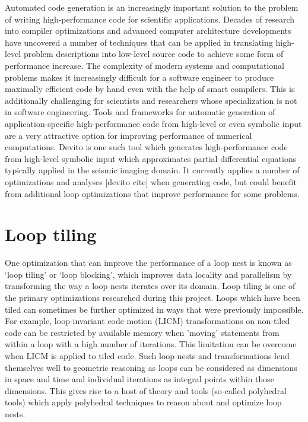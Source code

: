 \documentclass[a4paper,12pt,twoside]{report}
\begin{document}
Automated code generation is an increasingly important solution to the problem of writing high-performance code
for scientific applications. Decades of research into compiler optimizations and advanced computer architecture developments
have uncovered a number of techniques that can be applied in translating high-level problem descriptions into low-level source code
to achieve some form of performance increase. The complexity of modern systems and computational problems makes it increasingly 
difficult for a software engineer to produce maximally efficient code by hand even with the help of smart
compilers. This is additionally challenging for scientists and researchers whose specialization is not in software engineering. Tools
and frameworks for automatic generation of application-specific high-performance code from high-level or even symbolic input are a very
attractive option for improving performance of numerical computations. Devito is one such tool which generates high-performance code from high-level symbolic
input which approximates partial differential equations typically applied in the seismic imaging domain. It currently applies a number 
of optimizations and analyses [devito cite] when generating code, but could benefit from additional loop optimizations that improve performance for some problems.


\section{Loop tiling}
One optimization that can improve the performance of a loop nest is known as `loop tiling' or `loop blocking', which improves data locality and parallelism
by transforming the way a loop nests iterates over its domain. Loop tiling is one of the primary optimizations researched during this project.
Loops which have been tiled can sometimes be further optimized in ways that were previously impossible. For example, 
loop-invariant code motion (LICM) transformations on non-tiled code can be restricted by available memory when 'moving'
statements from within a loop with a high number of iterations. This limitation can be overcome when LICM is applied to tiled code. Such
loop nests and transformations lend themselves well to geometric reasoning as loops can be considered as dimensions in space and time and individual
iterations as integral points within those dimensions. This gives rise to a host of theory and tools (so-called polyhedral tools) which apply polyhedral 
techniques to reason about and optimize loop nests.
\end{document}

